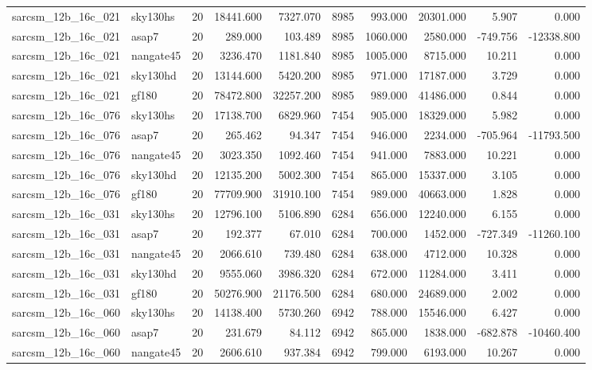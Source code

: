 \begin{tabular}{llrrrrrrrr}
sarcsm\_12b\_16c\_021 & sky130hs & 20 & 18441.600 & 7327.070 & 8985 & 993.000 & 20301.000 & 5.907 & 0.000 \\
sarcsm\_12b\_16c\_021 & asap7 & 20 & 289.000 & 103.489 & 8985 & 1060.000 & 2580.000 & -749.756 & -12338.800 \\
sarcsm\_12b\_16c\_021 & nangate45 & 20 & 3236.470 & 1181.840 & 8985 & 1005.000 & 8715.000 & 10.211 & 0.000 \\
sarcsm\_12b\_16c\_021 & sky130hd & 20 & 13144.600 & 5420.200 & 8985 & 971.000 & 17187.000 & 3.729 & 0.000 \\
sarcsm\_12b\_16c\_021 & gf180 & 20 & 78472.800 & 32257.200 & 8985 & 989.000 & 41486.000 & 0.844 & 0.000 \\
sarcsm\_12b\_16c\_076 & sky130hs & 20 & 17138.700 & 6829.960 & 7454 & 905.000 & 18329.000 & 5.982 & 0.000 \\
sarcsm\_12b\_16c\_076 & asap7 & 20 & 265.462 & 94.347 & 7454 & 946.000 & 2234.000 & -705.964 & -11793.500 \\
sarcsm\_12b\_16c\_076 & nangate45 & 20 & 3023.350 & 1092.460 & 7454 & 941.000 & 7883.000 & 10.221 & 0.000 \\
sarcsm\_12b\_16c\_076 & sky130hd & 20 & 12135.200 & 5002.300 & 7454 & 865.000 & 15337.000 & 3.105 & 0.000 \\
sarcsm\_12b\_16c\_076 & gf180 & 20 & 77709.900 & 31910.100 & 7454 & 989.000 & 40663.000 & 1.828 & 0.000 \\
sarcsm\_12b\_16c\_031 & sky130hs & 20 & 12796.100 & 5106.890 & 6284 & 656.000 & 12240.000 & 6.155 & 0.000 \\
sarcsm\_12b\_16c\_031 & asap7 & 20 & 192.377 & 67.010 & 6284 & 700.000 & 1452.000 & -727.349 & -11260.100 \\
sarcsm\_12b\_16c\_031 & nangate45 & 20 & 2066.610 & 739.480 & 6284 & 638.000 & 4712.000 & 10.328 & 0.000 \\
sarcsm\_12b\_16c\_031 & sky130hd & 20 & 9555.060 & 3986.320 & 6284 & 672.000 & 11284.000 & 3.411 & 0.000 \\
sarcsm\_12b\_16c\_031 & gf180 & 20 & 50276.900 & 21176.500 & 6284 & 680.000 & 24689.000 & 2.002 & 0.000 \\
sarcsm\_12b\_16c\_060 & sky130hs & 20 & 14138.400 & 5730.260 & 6942 & 788.000 & 15546.000 & 6.427 & 0.000 \\
sarcsm\_12b\_16c\_060 & asap7 & 20 & 231.679 & 84.112 & 6942 & 865.000 & 1838.000 & -682.878 & -10460.400 \\
sarcsm\_12b\_16c\_060 & nangate45 & 20 & 2606.610 & 937.384 & 6942 & 799.000 & 6193.000 & 10.267 & 0.000 \\

\end{tabular}
